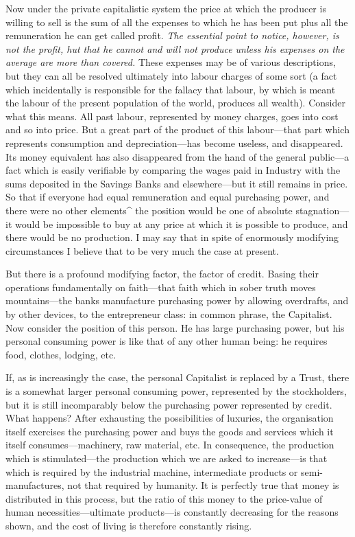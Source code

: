 \documentclass{book}
\begin{document}
Now under the private capitalistic system the price at which the producer is willing to sell is the sum of all the expenses to which he has been put plus all the remuneration he can get called profit. \emph{The essential point to notice, however, is not the profit, hut that he cannot and will not produce unless his expenses on the average are more than covered.} These expenses may be of various descriptions, but they can all be resolved ultimately into labour charges of some sort (a fact which incidentally is responsible for the fallacy that labour, by which is meant the labour of the present population of the world, produces all wealth). Consider what this means. All past labour, represented by money charges, goes into cost and so into price. But a great part of the product of this labour—that part which represents consumption and depreciation—has become useless, and disappeared. Its money equivalent has also disappeared from the hand of the general public—a fact which is easily verifiable by comparing the wages paid in Industry with the sums deposited in the Savings Banks and elsewhere—but it still remains in price. So that if everyone had equal remuneration and equal purchasing power, and there were no other elements\textasciicircum{} the position would be one of absolute stagnation—it would be impossible to buy at any price at which it is possible to produce, and there would be no production. I may say that in spite of enormously modifying circumstances I believe that to be very much the case at present.

But there is a profound modifying factor, the factor of credit. Basing their operations fundamentally on faith—that faith which in sober truth moves mountains—the banks manufacture purchasing power by allowing overdrafts, and by other devices, to the entrepreneur class: in common phrase, the Capitalist. Now consider the position of this person. He has large purchasing power, but his personal consuming power is like that of any other human being: he requires food, clothes, lodging, etc.

If, as is increasingly the case, the personal Capitalist is replaced by a Trust, there is a somewhat larger personal consuming power, represented by the stockholders, but it is still incomparably below the purchasing power represented by credit. What happens? After exhausting the possibilities of luxuries, the organisation itself exercises the purchasing power and buys the goods and services which it itself consumes—machinery, raw material, etc. In consequence, the production which is stimulated—the production which we are asked to increase—is that which is required by the industrial machine, intermediate products or semi-manufactures, not that required by humanity. It is perfectly true that money is distributed in this process, but the ratio of this money to the price-value of human necessities—ultimate products—is constantly decreasing for the reasons shown, and the cost of living is therefore constantly rising.
\end{document}
